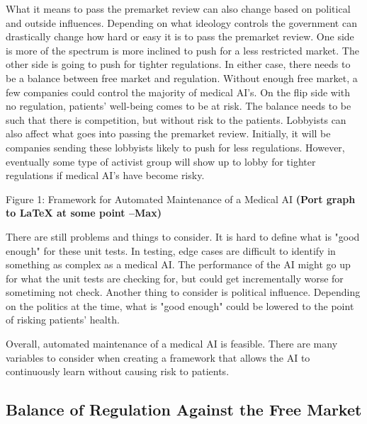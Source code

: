 \documentclass[]{article}
\begin{document}
			What it means to pass the premarket review can also change based on political and outside influences. Depending on what ideology controls the government can drastically change how hard or easy it is to pass the premarket review. One side is more of the spectrum is more inclined to push for a less restricted market. The other side is going to push for tighter regulations. In either case, there needs to be a balance between free market and regulation. Without enough free market, a few companies could control the majority of medical AI's. On the flip side with no regulation, patients' well-being comes to be at risk. The balance needs to be such that there is competition, but without risk to the patients. Lobbyists can also affect what goes into passing the premarket review. Initially, it will be companies sending these lobbyists likely to push for less regulations. However, eventually some type of activist group will show up to lobby for tighter regulations if medical AI's have become risky.

			Figure 1: Framework for Automated Maintenance of a Medical AI \textbf{(Port graph to LaTeX at some point --Max)}

			There are still problems and things to consider. It is hard to define what is "good enough" for these unit tests. In testing, edge cases are difficult to identify in something as complex as a medical AI. The performance of the AI might go up for what the unit tests are checking for, but could get incrementally worse for sometiming not check. Another thing to consider is political influence. Depending on the politics at the time, what is "good enough" could be lowered to the point of risking patients' health.
		
			Overall, automated maintenance of a medical AI is feasible. There are many variables to consider when creating a framework that allows the AI to continuously learn without causing risk to patients. 

		\subsection{Balance of Regulation Against the Free Market}\label{market}

			
\medskip



		
\end{document}
